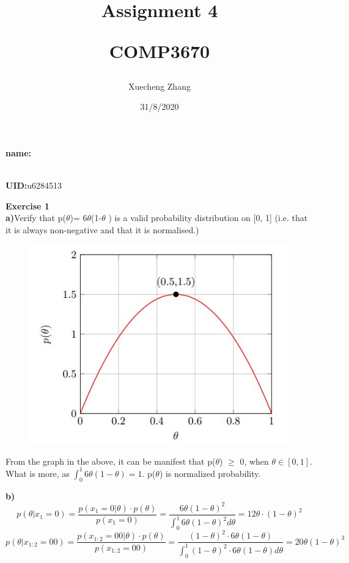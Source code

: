 \documentclass{article}
\title{Assignment  4\\ \vspace{0.2cm}

		COMP3670
}
\begin{document}
\setlength\parindent{0pt}
\maketitle
\vspace*{\fill}
    \begin{center}
    
        \textbf{name:}\author{Xuecheng Zhang}
        \\
        \textbf{UID:}u6284513
        
        \vspace{1.8cm}
        
        \date{31/8/2020}
    
    \end{center}
\vspace*{\fill}

\newpage

\textbf{Exercise 1}\\
\textbf{a)}Verify that p($\theta$)= 6$\theta$(1-$\theta$ ) is a valid probability distribution on [0, 1] (i.e. that it is always non-negative and that it is normalised.)\\
\begin{figure}[H]
\centering
\includegraphics[width = \linewidth]{1.jpg}
\end{figure}
From the graph in the above, it can be manifest that p($\theta$) $\geq$  0, when $\theta \in [0,1]$. 
What is more, as $\int_{0}^{1} 6\theta (1-\theta ) = 1$. p($\theta$) is normalized probability.

\textbf{b)}
\[p(\theta| x_1 = 0 ) = \frac{p(x_1 = 0|\theta)\cdot p(\theta)}{p(x_1 = 0)} = \frac{6\theta(1-\theta)^2}{\int_{0}^{1}6\theta(1-\theta)^2 d\theta}= 12\theta\cdot(1-\theta)^2\]
\[p(\theta | x_{1:2} = 00) = \frac{p(x_{1:2} = 00 | \theta)\cdot p(\theta)}{p(x_{1:2} = 00)} = \frac{(1-\theta)^2\cdot 6\theta(1-\theta)}{\int_{0}^{1}(1-\theta)^2\cdot 6\theta(1-\theta)d\theta} = 20\theta(1-\theta)^3\]
\end{document}
